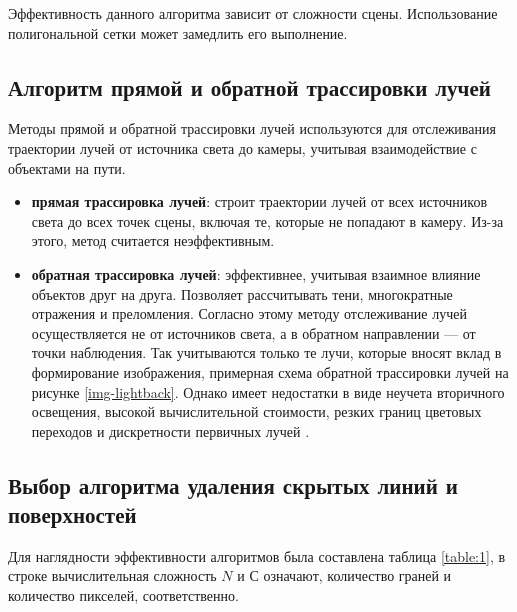Эффективность данного алгоритма зависит от сложности сцены. Использование полигональной сетки может замедлить его выполнение.


\subsection{Алгоритм прямой и обратной трассировки лучей}

Методы прямой и обратной трассировки лучей используются для отслеживания траектории лучей от источника света до камеры, учитывая взаимодействие с объектами на пути. 


\begin{itemize}
	\item \textbf{прямая трассировка лучей}: строит траектории лучей от всех источников света до всех точек сцены, включая те, которые не попадают в камеру. Из-за этого, метод считается неэффективным.
	
	\item \textbf{обратная трассировка лучей}: эффективнее, учитывая взаимное влияние объектов друг на друга. Позволяет рассчитывать тени, многократные отражения и преломления. Согласно этому методу отслеживание лучей осуществляется не от источников света, а в обратном направлении --- от точки наблюдения. Так учитываются только те лучи, которые вносят вклад в формирование изображения, примерная схема обратной трассировки лучей на рисунке \ref{img-lightback}. Однако имеет недостатки в виде неучета вторичного освещения, высокой вычислительной стоимости, резких границ цветовых переходов и дискретности первичных лучей \cite{ray_tracing}.
	
\end{itemize}
 
 
\subsection{Выбор алгоритма удаления скрытых линий и поверхностей}


Для наглядности эффективности алгоритмов была составлена таблица \ref{table:1}, в строке вычислительная сложность $N$ и $С$ означают, количество граней и количество пикселей, соответственно.

